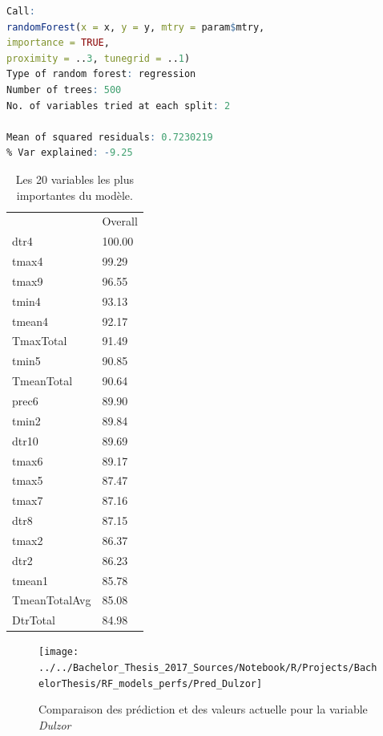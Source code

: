 \begin{minipage}{\linewidth}
	
	\begin{lstlisting}[showstringspaces=false,language=R, caption={Test du modèle de classification},captionpos=b]
Call:
randomForest(x = x, y = y, mtry = param$mtry, 
importance = TRUE,      
proximity = ..3, tunegrid = ..1) 
Type of random forest: regression
Number of trees: 500
No. of variables tried at each split: 2

Mean of squared residuals: 0.7230219
% Var explained: -9.25
	\end{lstlisting}
\end{minipage}


\begin{table}[H]
	\centering
	\caption{Les 20 variables les plus importantes du modèle.}
	\label{RF_Dulzor_Varimp}
	\begin{tabular}{ll}
              & Overall \\
dtr4          & 100.00  \\
tmax4         & 99.29   \\
tmax9         & 96.55   \\
tmin4         & 93.13   \\
tmean4        & 92.17   \\
TmaxTotal     & 91.49   \\
tmin5         & 90.85   \\
TmeanTotal    & 90.64   \\
prec6         & 89.90   \\
tmin2         & 89.84   \\
dtr10         & 89.69   \\
tmax6         & 89.17   \\
tmax5         & 87.47   \\
tmax7         & 87.16   \\
dtr8          & 87.15   \\
tmax2         & 86.37   \\
dtr2          & 86.23   \\
tmean1        & 85.78   \\
TmeanTotalAvg & 85.08   \\
DtrTotal      & 84.98
	\end{tabular}
\end{table}


\begin{figure}[H]
	\centering
	\texttt{[image: ../../Bachelor\_Thesis\_2017\_Sources/Notebook/R/Projects/BachelorThesis/RF\_models\_perfs/Pred\_Dulzor]}
	\caption{Comparaison des prédiction et des valeurs actuelle pour la variable \textit{Dulzor}}
	\label{fig:preddulzor}
\end{figure}


